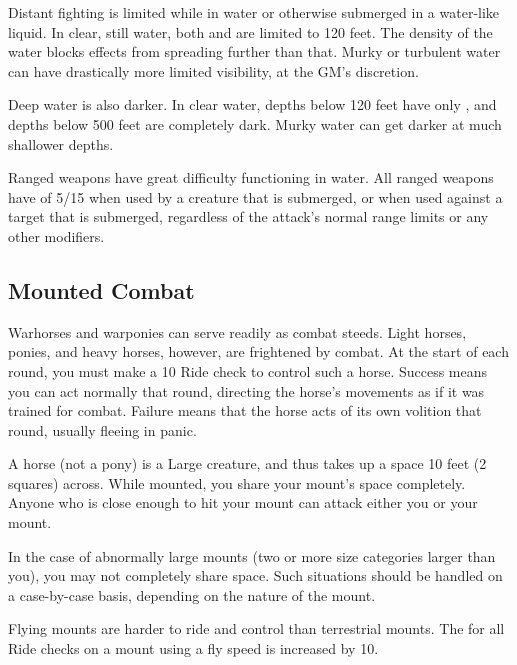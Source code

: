     Distant fighting is limited while in water or otherwise submerged in a water-like liquid.
    In clear, still water, both  and  are limited to 120 feet.
    The density of the water blocks effects from spreading further than that.
    Murky or turbulent water can have drastically more limited visibility, at the GM's discretion.

    Deep water is also darker.
    In clear water, depths below 120 feet have only , and depths below 500 feet are completely dark.
    Murky water can get darker at much shallower depths.

    Ranged weapons have great difficulty functioning in water.
    All ranged weapons have  of 5/15 when used by a creature that is submerged, or when used against a target that is submerged, regardless of the attack's normal range limits or any other modifiers.

  \subsection{Mounted Combat}\label{Mounted Combat}
     Warhorses and warponies can serve readily as combat steeds. Light horses, ponies, and heavy horses, however, are frightened by combat.
    At the start of each round, you must make a  10 Ride check to control such a horse.
    Success means you can act normally that round, directing the horse's movements as if it was trained for combat.
    Failure means that the horse acts of its own volition that round, usually fleeing in panic.

     A horse (not a pony) is a Large creature, and thus takes up a space 10 feet (2 squares) across. While mounted, you share your mount's space completely. Anyone who is close enough to hit your mount can attack either you or your mount.

    In the case of abnormally large mounts (two or more size categories larger than you), you may not completely share space. Such situations should be handled on a case-by-case basis, depending on the nature of the mount.

     Flying mounts are harder to ride and control than terrestrial mounts.
    The  for all Ride checks on a mount using a fly speed is increased by 10.

